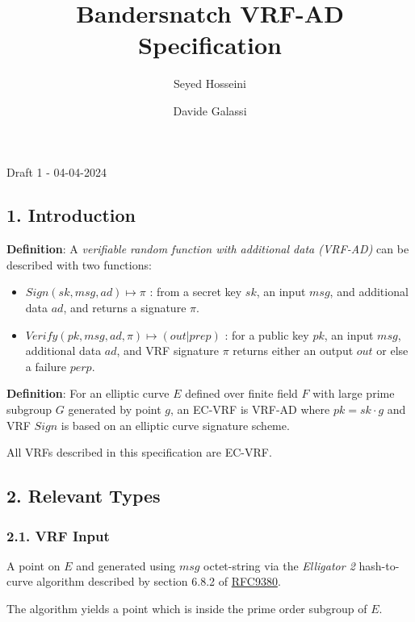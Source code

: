 \documentclass[
]{article}
\title{Bandersnatch VRF-AD Specification}
\author{Seyed Hosseini \and Davide Galassi}
\date{}
\providecommand{\tightlist}{%
  \setlength{\itemsep}{0pt}\setlength{\parskip}{0pt}}
\begin{document}
\maketitle

Draft 1 - 04-04-2024

\hypertarget{introduction}{%
\subsection{1. Introduction}\label{introduction}}

\textbf{Definition}: A \emph{verifiable random function with additional
data (VRF-AD)} can be described with two functions:

\begin{itemize}
\tightlist
\item
  \(Sign(sk,msg,ad) \mapsto \pi\) : from a secret key \(sk\), an input
  \(msg\), and additional data \(ad\), and returns a signature \(\pi\).
\item
  \(Verify(pk,msg,ad,\pi) \mapsto (out|prep)\) : for a public key
  \(pk\), an input \(msg\), additional data \(ad\), and VRF signature
  \(\pi\) returns either an output \(out\) or else a failure \(perp\).
\end{itemize}

\textbf{Definition}: For an elliptic curve \(E\) defined over finite
field \(F\) with large prime subgroup \(G\) generated by point \(g\), an
EC-VRF is VRF-AD where \(pk = sk \cdot g\) and VRF \(Sign\) is based on
an elliptic curve signature scheme.

All VRFs described in this specification are EC-VRF.

\hypertarget{relevant-types}{%
\subsection{2. Relevant Types}\label{relevant-types}}

\hypertarget{vrf-input}{%
\subsubsection{2.1. VRF Input}\label{vrf-input}}

A point on \(E\) and generated using \(msg\) octet-string via the
\emph{Elligator 2} hash-to-curve algorithm described by section 6.8.2 of
\href{https://datatracker.ietf.org/doc/rfc9380/}{RFC9380}.

The algorithm yields a point which is inside the prime order subgroup of
\(E\).
\end{document}

